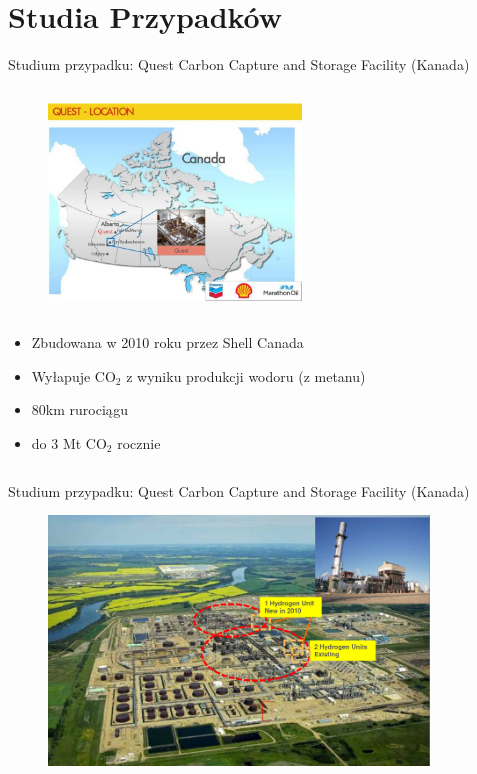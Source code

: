 \section{Studia Przypadków}


\begin{columnframe}{Studium przypadku: Quest Carbon Capture and Storage Facility (Kanada)}
    \begin{column}{0.5\textwidth}
        \begin{figure}
            \centering
            \includegraphics[width=0.6\textwidth, frame]{images/quest_alberta_canada_map.jpg}
        \end{figure}
    \end{column}
    \begin{column}{0.5\textwidth}
        \begin{itemize}
            \item Zbudowana w 2010 roku przez Shell Canada
            \item Wyłapuje CO$_2$ z wyniku produkcji wodoru (z metanu)
            \item 80km rurociągu
            \item do 3 Mt CO$_2$ rocznie
        \end{itemize}
    \end{column}
\end{columnframe}

\begin{frame}{Studium przypadku: Quest Carbon Capture and Storage Facility (Kanada)}
    \begin{figure}
        \centering
        \includegraphics[width=0.9\textwidth, frame]{images/quest_ccs_hydrogen_farms.png}
    \end{figure}
\end{frame}

